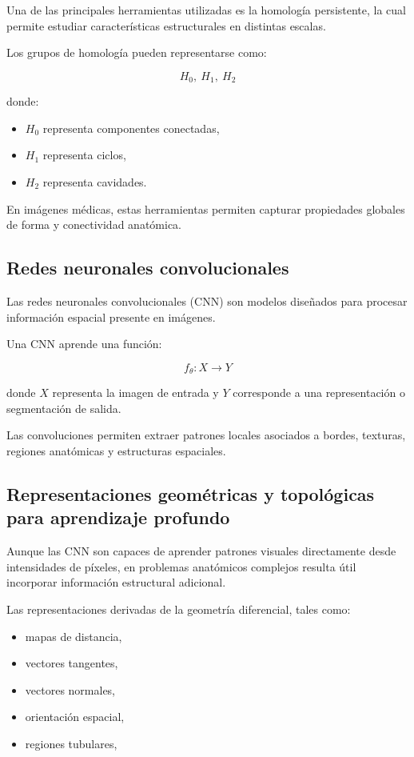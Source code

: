 \documentclass[conference]{IEEEtran}
\begin{document}
Una de las principales herramientas utilizadas es la homología persistente, la cual permite estudiar características estructurales en distintas escalas.

Los grupos de homología pueden representarse como:

\[
H_0,\ H_1,\ H_2
\]

donde:

\begin{itemize}
    \item $H_0$ representa componentes conectadas,
    \item $H_1$ representa ciclos,
    \item $H_2$ representa cavidades.
\end{itemize}

En imágenes médicas, estas herramientas permiten capturar propiedades globales de forma y conectividad anatómica.

\subsection{Redes neuronales convolucionales}

Las redes neuronales convolucionales (CNN) son modelos diseñados para procesar información espacial presente en imágenes.

Una CNN aprende una función:

\[
f_{\theta}:X\rightarrow Y
\]

donde $X$ representa la imagen de entrada y $Y$ corresponde a una representación o segmentación de salida.

Las convoluciones permiten extraer patrones locales asociados a bordes, texturas, regiones anatómicas y estructuras espaciales.

\subsection{Representaciones geométricas y topológicas para aprendizaje profundo}

Aunque las CNN son capaces de aprender patrones visuales directamente desde intensidades de píxeles, en problemas anatómicos complejos resulta útil incorporar información estructural adicional.

Las representaciones derivadas de la geometría diferencial, tales como:

\begin{itemize}
    \item mapas de distancia,
    \item vectores tangentes,
    \item vectores normales,
    \item orientación espacial,
    \item regiones tubulares,
\end{itemize}
\end{document}
